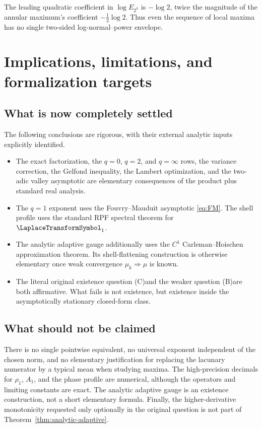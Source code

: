 \documentclass[11pt]{article}
\theoremstyle{definition}
\theoremstyle{remark}
\newcommand{\Ceq}{\textup{(C)}}
\newcommand{\Beq}{\textup{(B)}}
\begin{document}
The leading quadratic coefficient in \(\log E_{2^k}\) is \(-\log2\),
twice the magnitude of the annular maximum's coefficient
\(-\tfrac12\log2\).  Thus even the sequence of local maxima has no single
two-sided log-normal--power envelope.

\section{Implications, limitations, and formalization targets}

\subsection{What is now completely settled}

The following conclusions are rigorous, with their external analytic inputs
explicitly identified.
\begin{itemize}
\item The exact factorization, the \(q=0\), \(q=2\), and \(q=\infty\) rows,
the variance correction, the Gelfond inequality, the Lambert optimization,
and the two-adic valley asymptotic are elementary consequences of the product
plus standard real analysis.
\item The \(q=1\) exponent uses the Fouvry--Mauduit asymptotic
\eqref{eq:FM}.  The shell profile uses the standard RPF spectral theorem for
\(\LaplaceTransformSymbol_1\).
\item The analytic adaptive gauge additionally uses the \(C^1\)
Carleman--Hoischen approximation theorem.  Its shell-flattening construction
is otherwise elementary once weak convergence \(\mu_k\Rightarrow\mu\) is
known.
\item The literal original existence question \Ceq and the weaker
question \Beq are both affirmative.  What fails is not existence, but
existence inside the asymptotically stationary closed-form class.
\end{itemize}

\subsection{What should not be claimed}

There is no single pointwise equivalent, no universal exponent independent of
the chosen norm, and no elementary justification for replacing the lacunary
numerator by a typical mean when studying maxima.  The high-precision decimals
for \(\rho_1\), \(A_1\), and the phase profile are numerical, although the
operators and limiting constants are exact.  The analytic adaptive gauge is an
existence construction, not a short elementary formula.  Finally, the
higher-derivative monotonicity requested only optionally in the original
question is not part of Theorem~\ref{thm:analytic-adaptive}.
\end{document}
